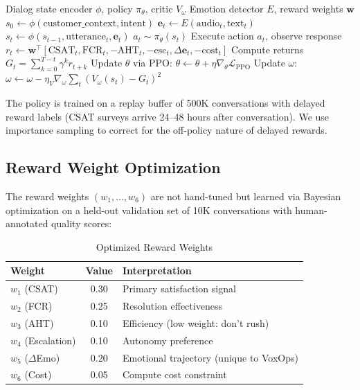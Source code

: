 \documentclass[conference,10pt]{IEEEtran}
\begin{document}
\begin{algorithm}[!t]
\caption{Emotion-Aware RL Conversation Policy}
\label{alg:rl}
\begin{algorithmic}[1]
\Require Dialog state encoder $\phi$, policy $\pi_\theta$, critic $V_\omega$
\Require Emotion detector $E$, reward weights $\mathbf{w}$
    \State $s_0 \leftarrow \phi(\text{customer\_context}, \text{intent})$
        \State $\mathbf{e}_t \leftarrow E(\text{audio}_t, \text{text}_t)$ 
        \State $s_t \leftarrow \phi(s_{t-1}, \text{utterance}_t, \mathbf{e}_t)$
        \State $a_t \sim \pi_\theta(s_t)$ 
        \State Execute action $a_t$, observe response
        \State $r_t \leftarrow \mathbf{w}^\top [\text{CSAT}_t, \text{FCR}_t, -\text{AHT}_t, -\text{esc}_t, \Delta\mathbf{e}_t, -\text{cost}_t]$
    \EndFor
    \State Compute returns $G_t = \sum_{k=0}^{T-t} \gamma^k r_{t+k}$
    \State Update $\theta$ via PPO: $\theta \leftarrow \theta + \eta \nabla_\theta \mathcal{L}_{\text{PPO}}$
    \State Update $\omega$: $\omega \leftarrow \omega - \eta_V \nabla_\omega \sum_t (V_\omega(s_t) - G_t)^2$
\EndFor
\end{algorithmic}
\end{algorithm}

The policy is trained on a replay buffer of 500K conversations with delayed reward labels (CSAT surveys arrive 24--48 hours after conversation). We use importance sampling to correct for the off-policy nature of delayed rewards.

\subsection{Reward Weight Optimization}

The reward weights $(w_1, \ldots, w_6)$ are not hand-tuned but learned via Bayesian optimization on a held-out validation set of 10K conversations with human-annotated quality scores:

\begin{table}[!htbp]
\caption{Optimized Reward Weights}
\label{tab:weights}
\centering\scriptsize
\begin{tabular}{@{}lcl@{}}
\toprule
\textbf{Weight} & \textbf{Value} & \textbf{Interpretation} \\
\midrule
$w_1$ (CSAT) & 0.30 & Primary satisfaction signal \\
$w_2$ (FCR) & 0.25 & Resolution effectiveness \\
$w_3$ (AHT) & 0.10 & Efficiency (low weight: don't rush) \\
$w_4$ (Escalation) & 0.10 & Autonomy preference \\
$w_5$ ($\Delta$Emo) & 0.20 & Emotional trajectory (unique to VoxOps) \\
$w_6$ (Cost) & 0.05 & Compute cost constraint \\
\bottomrule
\end{tabular}
\end{table}
\end{document}
